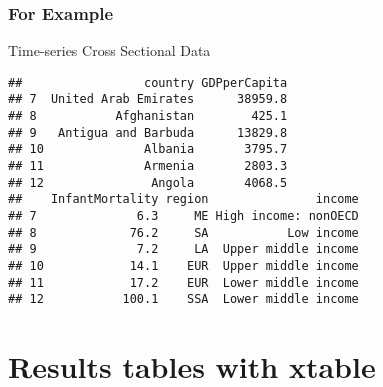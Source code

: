 \documentclass{beamer}\usepackage{graphicx, color}
\makeatletter
\newenvironment{kframe}{%
 \def\at@end@of@kframe{}%
 \ifinner\ifhmode%
  \def\at@end@of@kframe{\end{minipage}}%
  \begin{minipage}{\columnwidth}%
 \fi\fi%
 \def\FrameCommand##1{\hskip\@totalleftmargin \hskip-\fboxsep
 \colorbox{shadecolor}{##1}\hskip-\fboxsep
     \hskip-\linewidth \hskip-\@totalleftmargin \hskip\columnwidth}%
 \MakeFramed {\advance\hsize-\width
   \@totalleftmargin\z@ \linewidth\hsize
   \@setminipage}}%
 {\par\unskip\endMakeFramed%
 \at@end@of@kframe}
\newenvironment{knitrout}{}{} %
\makeatother
\begin{document}
\begin{frame}[fragile]
  \frametitle{For Example}
  Time-series Cross Sectional Data
\begin{knitrout}
\color{fgcolor}\begin{kframe}
\begin{verbatim}
##                 country GDPperCapita
## 7  United Arab Emirates      38959.8
## 8           Afghanistan        425.1
## 9   Antigua and Barbuda      13829.8
## 10              Albania       3795.7
## 11              Armenia       2803.3
## 12               Angola       4068.5
##    InfantMortality region               income
## 7              6.3     ME High income: nonOECD
## 8             76.2     SA           Low income
## 9              7.2     LA  Upper middle income
## 10            14.1    EUR  Upper middle income
## 11            17.2    EUR  Lower middle income
## 12           100.1    SSA  Lower middle income
\end{verbatim}
\end{kframe}
\end{knitrout}

\end{frame}

\section{Results tables with xtable}
\end{document}
